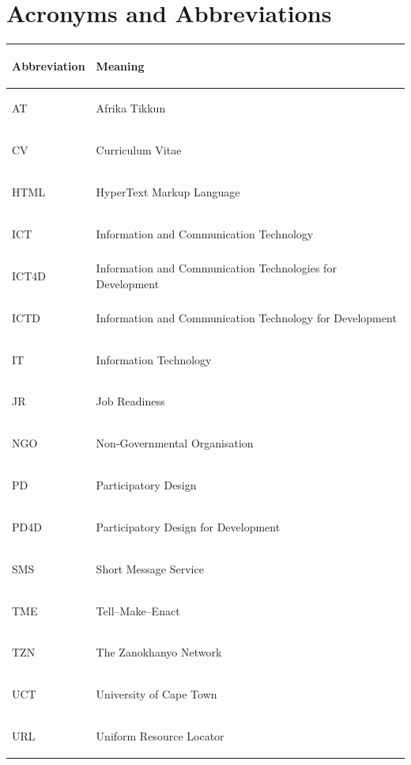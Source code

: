 \chapter*{Acronyms and Abbreviations}
\thispagestyle{plain}

\vspace{-0.3cm}

\renewcommand{\arraystretch}{1.18}
\setlength{\tabcolsep}{7pt}

\begin{tabularx}{\textwidth}{
    >{\bfseries\raggedright\arraybackslash}p{3.8cm}
    >{\raggedright\arraybackslash}X
}

\rowcolor{black!10}
\textbf{Abbreviation} & \textbf{Meaning} \\[0.08cm]
\hline

AT      & Afrika Tikkun \\
\hline
CV      & Curriculum Vitae \\
\hline
HTML    & HyperText Markup Language \\
\hline
ICT     & Information and Communication Technology \\
\hline
ICT4D   & Information and Communication Technologies for Development \\
\hline
ICTD    & Information and Communication Technology for Development \\
\hline
IT      & Information Technology \\
\hline
JR      & Job Readiness \\
\hline
NGO     & Non-Governmental Organisation \\
\hline
PD      & Participatory Design \\
\hline
PD4D    & Participatory Design for Development \\
\hline
SMS     & Short Message Service \\
\hline
TME     & Tell--Make--Enact \\
\hline
TZN     & The Zanokhanyo Network \\
\hline
UCT     & University of Cape Town \\
\hline
URL     & Uniform Resource Locator \\

\end{tabularx}